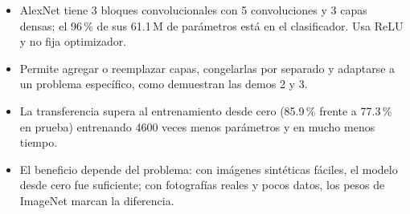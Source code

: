 \documentclass[12pt,a4paper]{article}
\begin{document}
\begin{itemize}
  \item AlexNet tiene 3 bloques convolucionales con 5 convoluciones y 3 capas densas; el 96\,\% de sus
  61.1\,M de parámetros está en el clasificador. Usa ReLU y no fija optimizador.
  \item Permite agregar o reemplazar capas, congelarlas por separado y adaptarse a un problema
  específico, como demuestran las demos 2 y 3.
  \item La transferencia supera al entrenamiento desde cero (85.9\,\% frente a 77.3\,\% en prueba)
  entrenando 4600 veces menos parámetros y en mucho menos tiempo.
  \item El beneficio depende del problema: con imágenes sintéticas fáciles, el modelo desde cero fue
  suficiente; con fotografías reales y pocos datos, los pesos de ImageNet marcan la diferencia.
\end{itemize}

\printbibliography
\end{document}
